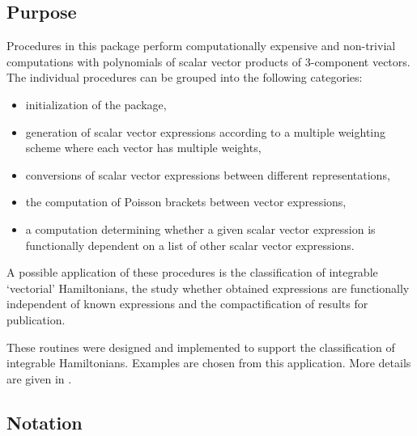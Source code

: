 \subsection{Purpose}

Procedures in this package perform computationally expensive and
non-trivial computations with polynomials of scalar vector products of
3-component vectors.  The individual procedures can be grouped into
the following categories:
\begin{itemize}
\item initialization of the package,
\item generation of scalar vector expressions according to a multiple
      weighting scheme where each vector has multiple weights,
\item conversions of scalar vector expressions between different
      representations,
\item the computation of Poisson brackets between vector expressions,
\item a computation determining whether a given scalar vector expression
      is functionally dependent on a list of other scalar vector expressions.
\end{itemize}
A possible application of these procedures is the classification of
integrable `vectorial' Hamiltonians, the study whether obtained
expressions are functionally independent of known expressions and the
compactification of results for publication.

These routines were designed and implemented to support the
classification of integrable Hamiltonians.  Examples are chosen from
this application.  More details are given in \cite{Sokolov_2006}.

\subsection{Notation}

